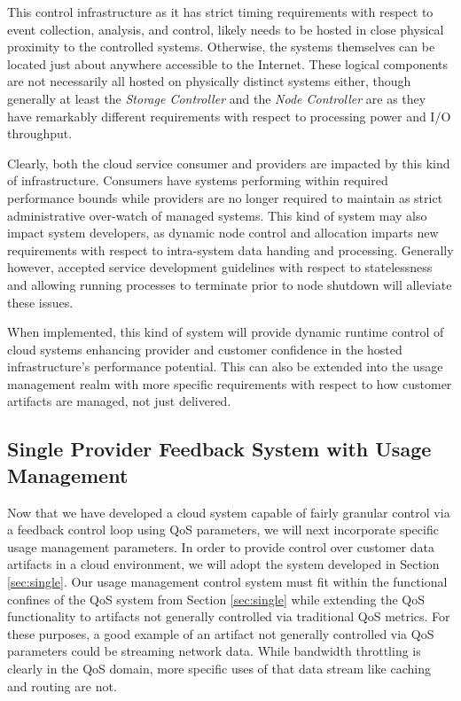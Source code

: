 \documentclass[10pt,letterpaper]{book}
\begin{document}
This control infrastructure as it has strict timing requirements with respect to event collection, analysis, and control, likely needs to be hosted in close physical proximity to the controlled systems.  Otherwise, the systems themselves can be located just about anywhere accessible to the Internet.  These logical components are not necessarily all hosted on physically distinct systems either, though generally at least the \textit{Storage Controller} and the \textit{Node Controller} are as they have remarkably different requirements with respect to processing power and I/O throughput.

Clearly, both the cloud service consumer and providers are impacted by this kind of infrastructure.  Consumers have systems performing within required performance bounds while providers are no longer required to maintain as strict administrative over-watch of managed systems.  This kind of system may also impact system developers, as dynamic node control and allocation imparts new requirements with respect to intra-system data handing and processing.  Generally however, accepted service development guidelines with respect to statelessness and allowing running processes to terminate prior to node shutdown will alleviate these issues.

When implemented, this kind of system will provide dynamic runtime control of cloud systems enhancing provider and customer confidence in the hosted infrastructure's performance potential.  This can also be extended into the usage management realm with more specific requirements with respect to how customer artifacts are managed, not just delivered.

\subsection{Single Provider Feedback System with Usage Management}\label{sec:singleUm}
Now that we have developed a cloud system capable of fairly granular control via a feedback control loop using QoS parameters, we will next incorporate specific usage management parameters.  In order to provide control over customer data artifacts in a cloud environment, we will adopt the system developed in Section \ref{sec:single}.  Our usage management control system must fit within the functional confines of the QoS system from Section \ref{sec:single} while extending the QoS functionality to artifacts not generally controlled via traditional QoS metrics.  For these purposes, a good example of an artifact not generally controlled via QoS parameters could be streaming network data.  While bandwidth throttling is clearly in the QoS domain, more specific uses of that data stream like caching and routing are not.   
\end{document}
